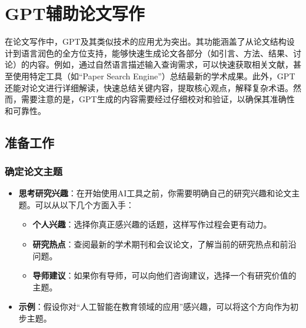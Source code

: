 \section{GPT辅助论文写作}

在论文写作中，GPT及其类似技术的应用尤为突出。其功能涵盖了从论文结构设计到语言润色的全方位支持，能够快速生成论文各部分（如引言、方法、结果、讨论）的内容。例如，通过自然语言描述输入查询需求，可以快速获取相关文献，甚至使用特定工具（如“Paper Search Engine”）总结最新的学术成果。此外，GPT还能对论文进行详细解读，快速总结关键内容，提取核心观点，解释复杂术语。然而，需要注意的是，GPT生成的内容需要经过仔细校对和验证，以确保其准确性和可靠性。

\subsection{准备工作}
\subsubsection{确定论文主题}
\begin{itemize}
    \item \textbf{思考研究兴趣}：在开始使用AI工具之前，你需要明确自己的研究兴趣和论文主题。可以从以下几个方面入手：
    \begin{itemize}
        \item \textbf{个人兴趣}：选择你真正感兴趣的话题，这样写作过程会更有动力。
        \item \textbf{研究热点}：查阅最新的学术期刊和会议论文，了解当前的研究热点和前沿问题。
        \item \textbf{导师建议}：如果你有导师，可以向他们咨询建议，选择一个有研究价值的主题。
    \end{itemize}
    \item \textbf{示例}：假设你对“人工智能在教育领域的应用”感兴趣，可以将这个方向作为初步主题。
\end{itemize}

